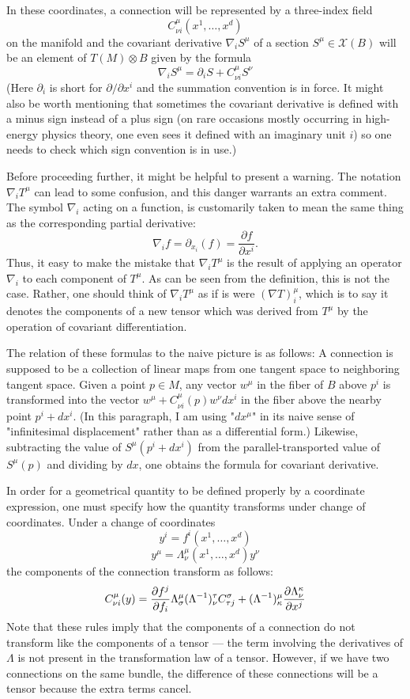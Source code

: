 \documentclass[12pt]{article}
\newcommand{\vs}{\mathcal{X}}
\newcommand{\cvf}[1]{\partial_{x_{#1}}}
\begin{document}
In these coordinates, a connection will be represented by a three-index field 
 $$C^\mu_{\nu i} (x^1, \ldots ,x^d)$$
on the manifold and the covariant derivative $\nabla_i S^\mu$ of a section $S^\mu \in \vs(B)$ will be an element of $T(M) \otimes B$ given by the formula
 $$\nabla_i S^\mu = \partial_i S + C^\mu_{\nu i} S^\nu$$
(Here $\partial_i$ is short for $\partial / \partial x^i$ and the summation convention is in force.  It might also be worth mentioning that sometimes the covariant derivative is defined with a minus sign instead of a plus sign (on rare occasions mostly occurring in high-energy physics theory, one even sees it defined with an imaginary unit $i$) so one needs to check which sign convention is in use.)

Before proceeding further, it might be helpful to present a warning.  The notation $\nabla_i T^\mu$ can lead to some confusion, and this danger
warrants an extra comment.  The symbol $\nabla_i$ acting on a
function, is customarily taken to mean the same thing as the
corresponding partial derivative:
 $$\nabla_i f = \cvf{i}(f) = \frac{\partial f}{\partial x^i}.$$
Thus, it easy to make the mistake that $\nabla_i T^\mu$ is the result of applying an operator $\nabla_i$ to each component of $T^\mu$.  As can be seen from the definition, this is not the case.  Rather, one should think of $\nabla_i T^\mu$ as if is were $(\nabla T)_i^\mu$, which is to say it denotes the components of a new tensor which was derived from $T^\mu$ by the operation of covariant differentiation.

The relation of these formulas to the naive picture is as follows:  A connection is supposed to be a collection of linear maps from one tangent space to neighboring tangent space.  Given a point $p \in M$, any vector $w^\mu$ in the fiber of $B$ above $p^i$ is transformed into the vector $w^\mu + C^\mu_{\nu i} (p) w^\nu dx^i$ in the fiber above the nearby point $p^i + dx^i$.  (In this paragraph, I am using "$dx^\mu$" in its naive sense of "infinitesimal displacement" rather than as a differential form.)
Likewise, subtracting the value of $S^\mu (p^i + dx^i)$ from the parallel-transported value of $S^\mu (p)$ and dividing by $dx$, one obtains the formula for covariant derivative.

In order for a geometrical quantity to be defined properly by a coordinate expression, one must specify how the quantity transforms under change of coordinates.  Under a change of coordinates
 $$y^i = f^i (x^1, \ldots, x^d)$$
 $$y^\mu = \Lambda^\mu_\nu (x^1, \ldots, x^d) y^\nu$$
the components of the connection transform as follows:
 $$C^\mu_{\nu i} (y) = {\partial f^j \over \partial f_i} \Lambda^\mu_\sigma (\Lambda^{-1})_\nu^\tau C^\sigma_{\tau j} + (\Lambda^{-1})^\mu_\kappa {\partial \Lambda^\kappa_\nu \over \partial x^j}$$
Note that these rules imply that the components of a connection do not transform like the components of a tensor --- the term involving the derivatives of $\Lambda$ is not present in the transformation law of a tensor.  However, if we have two connections on the same bundle, the difference of these connections will be a tensor because the extra terms cancel.
\end{document}

